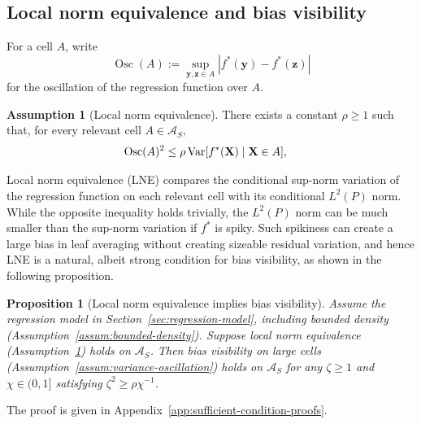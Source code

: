 \documentclass[11pt]{article}
\theoremstyle{plain}
\newtheorem{proposition}[theorem]{Proposition}
\theoremstyle{definition}
\newtheorem{assumption}[theorem]{Assumption}
\theoremstyle{remark}
\theoremstyle{plain}
\newcommand{\by}{\mathbf{y}}
\newcommand{\bz}{\mathbf{z}}
\newcommand{\bX}{\mathbf{X}}
\newcommand{\Var}{\textnormal{Var}}
\newcommand{\1}{\mathbbm{1}}
\newcommand{\Osc}{\operatorname{Osc}}
\begin{document}

\subsection{Local norm equivalence and bias visibility}
\label{section:special:SID,VC}

For a cell $A$, write
\[
\Osc(A):=\sup_{\by,\bz\in A}|f^*(\by)-f^*(\bz)|
\]
for the oscillation of the regression function over $A$.

\begin{assumption}[Local norm equivalence]
\label{assum:local-norm-equivalence}
There exists a constant $\rho\ge1$ such that, for every relevant cell $A\in\mathcal A_S$,
\begin{align}
\label{eq:local-norm-osc}
\Osc(A)^2
&\le
\rho\,\Var[f^*(\bX)\mid\bX\in A],
\end{align}
\end{assumption}

Local norm equivalence (LNE) compares the conditional sup-norm variation of the regression function on each relevant cell with its conditional $L^2(P)$ norm.
While the opposite inequality holds trivially, the $L^2(P)$ norm can be much smaller than the sup-norm variation if $f^*$ is spiky.
Such spikiness can create a large bias in leaf averaging without creating sizeable residual variation, and hence LNE is a natural, albeit strong condition for bias visibility, as shown in the following proposition.

\begin{proposition}[Local norm equivalence implies bias visibility]
\label{prop:lne-implies-bias-visibility}
Assume the regression model in Section~\ref{sec:regression-model}, including bounded density (Assumption~\ref{assum:bounded-density}).
Suppose local norm equivalence (Assumption~\ref{assum:local-norm-equivalence}) holds on $\mathcal A_S$.
Then bias visibility on large cells (Assumption~\ref{assum:variance-oscillation}) holds on $\mathcal A_S$ for any $\zeta\ge1$ and $\chi\in(0,1]$ satisfying $\zeta^2\ge\rho\chi^{-1}$.
\end{proposition}
The proof is given in Appendix~\ref{app:sufficient-condition-proofs}.
\end{document}

